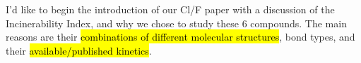 \documentclass{article}
\begin{document}
I’d like to begin the introduction of our Cl/F paper with a discussion of the Incinerability Index, and why we chose to study these 6 compounds. The main reasons are their \hl{combinations of different molecular structures}, bond types, and their \hl{available/published kinetics}. %
\end{document}
